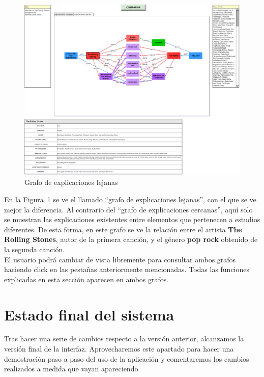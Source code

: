 \begin{figure}[h!]
	\centering
	\includegraphics[width = 1\textwidth]{Imagenes/Bitmap/Tercera Interfaz (Alternativa).png}
	\caption{Grafo de explicaciones lejanas}
	\label{fig:grafoLejano}
\end{figure}

En la Figura~\ref{fig:grafoLejano} se ve el llamado ``grafo de explicaciones lejanas'', con el que se ve mejor la diferencia. Al contrario del ``grafo de explicaciones cercanas'', aquí solo se muestran las explicaciones existentes entre elementos que pertenecen a estudios diferentes. De esta forma, en este grafo se ve la relación entre el artista \textbf{The Rolling Stones}, autor de la primera canción, y el género \textbf{pop rock} obtenido de la segunda canción.\\

El usuario podrá cambiar de vista libremente para consultar ambos grafos haciendo click en las pestañas anteriormente mencionadas. Todas las funciones explicadas en esta sección aparecen en ambos grafos.\\

\section{Estado final del sistema}

Tras hacer una serie de cambios respecto a la versión anterior, alcanzamos la versión final de la interfaz. Aprovecharemos este apartado para hacer una demostración paso a paso del uso de la aplicación y comentaremos los cambios realizados a medida que vayan apareciendo.\\

